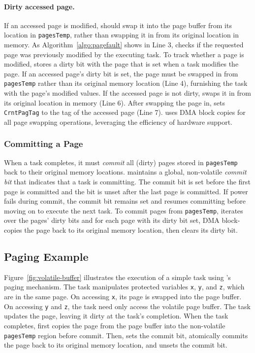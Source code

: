 \paragraph{Dirty accessed page.} If an accessed page is modified, \sys should swap it into the page buffer from its location in {\tt pagesTemp}, rather than swapping it in from its original location in memory. As Algorithm~\ref{algo:pagefault} shows in Line 3, \sys checks if the requested page was previously modified by the executing task. To track whether a page is modified, \sys stores a dirty bit with the page that is set when a task modifies the page. If an accessed page's dirty bit is set, the page must be swapped in from \texttt{pagesTemp} rather than its original memory location (Line 4), furnishing the task with the page's modified values. If the accessed page is not dirty, \sys swaps it in from its original location in memory (Line 6). After swapping the page in, \sys sets \texttt{CrntPagTag} to the tag of the accessed page (Line 7). \sys uses DMA block copies for all page swapping operations, leveraging the efficiency of hardware support.

\subsubsection{Committing a Page}

When a task completes, it must {\em commit} all (dirty) pages stored in \texttt{pagesTemp} back to their original memory locations. \sys maintains a global, non-volatile {\em commit bit} that indicates that a task is committing. The commit bit is set before the first page is committed and the bit is unset after the last page is committed. If power fails during commit, the commit bit remains set and \sys resumes committing before moving on to execute the next task. To commit pages from {\tt pagesTemp}, \sys iterates over the pages' dirty bits and for each page with its dirty bit set, \sys DMA block-copies the page back to its
original memory location, then clears its dirty bit.

\subsection{Paging Example}

Figure~\ref{fig:volatile-buffer} illustrates the execution of a simple task using \sys's paging mechanism. The task manipulates protected variables {\tt x}, {\tt y}, and {\tt z}, which are in the same page. On accessing {\tt x}, its page is swapped into the page buffer. On accessing {\tt y} and {\tt z}, the task need only access the volatile page buffer. The task updates the page, leaving it dirty at the task's completion. When the task completes, \sys first copies the page from the page buffer into the non-volatile {\tt pagesTemp} region before commit. Then, \sys sets the commit bit, atomically commits the page back to its original memory location, and unsets the commit bit.

